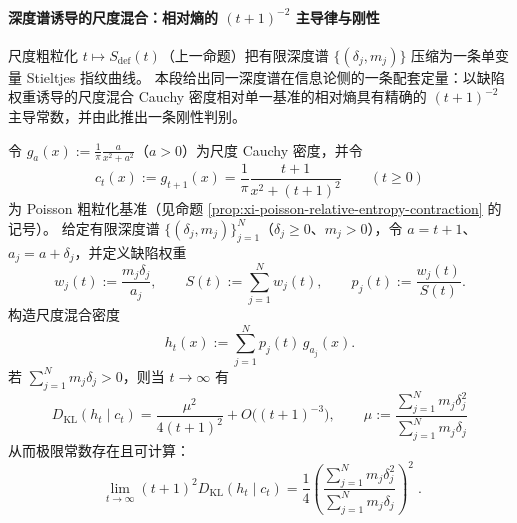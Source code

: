 \paragraph{深度谱诱导的尺度混合：相对熵的 \texorpdfstring{$(t+1)^{-2}$}{(t+1)^{-2}} 主导律与刚性}\label{par:xi-defect-depth-scale-mixture-kl}
尺度粗粒化 \(t\mapsto S_{\mathrm{def}}(t)\)（上一命题）把有限深度谱 \(\{(\delta_j,m_j)\}\) 压缩为一条单变量 Stieltjes 指纹曲线。
本段给出同一深度谱在信息论侧的一条配套定量：以缺陷权重诱导的尺度混合 Cauchy 密度相对单一基准的相对熵具有精确的 \((t+1)^{-2}\) 主导常数，并由此推出一条刚性判别。

\begin{proposition}\label{prop:xi-defect-scale-mixture-kl-leading}
令 \(g_a(x):=\frac{1}{\pi}\frac{a}{x^2+a^2}\)（\(a>0\)）为尺度 Cauchy 密度，并令
\[
c_t(x):=g_{t+1}(x)=\frac{1}{\pi}\frac{t+1}{x^2+(t+1)^2}\qquad(t\ge 0)
\]
为 Poisson 粗粒化基准（见命题 \ref{prop:xi-poisson-relative-entropy-contraction} 的记号）。
给定有限深度谱 \(\{(\delta_j,m_j)\}_{j=1}^N\)（\(\delta_j\ge 0\)、\(m_j>0\)），令 \(a=t+1\)、\(a_j=a+\delta_j\)，并定义缺陷权重
\[
w_j(t):=\frac{m_j\delta_j}{a_j},\qquad
S(t):=\sum_{j=1}^N w_j(t),\qquad
p_j(t):=\frac{w_j(t)}{S(t)}.
\]
构造尺度混合密度
\[
h_t(x):=\sum_{j=1}^N p_j(t)\,g_{a_j}(x).
\]
若 \(\sum_{j=1}^N m_j\delta_j>0\)，则当 \(t\to\infty\) 有
\begin{equation}\label{eq:xi-defect-scale-mixture-kl-leading}
\boxed{\;
D_{\mathrm{KL}}(h_t\mid c_t)
=\frac{\mu^2}{4(t+1)^2}+O\!\bigl((t+1)^{-3}\bigr),\qquad
\mu:=\frac{\sum_{j=1}^N m_j\delta_j^2}{\sum_{j=1}^N m_j\delta_j}\;}
\end{equation}
从而极限常数存在且可计算：
\[
\boxed{\;
\lim_{t\to\infty}(t+1)^2D_{\mathrm{KL}}(h_t\mid c_t)
=\frac14\left(\frac{\sum_{j=1}^N m_j\delta_j^2}{\sum_{j=1}^N m_j\delta_j}\right)^2\; }.
\]
\end{proposition}

